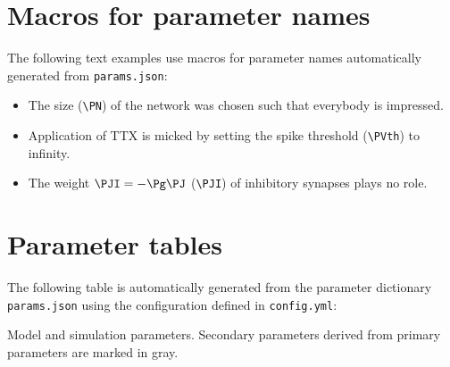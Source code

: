 \documentclass[10pt,a4paper,american]{article}
\begin{document}
\section{Macros for parameter names}


The following text examples use macros for parameter names automatically generated from \texttt{params.json}:
\begin{itemize}
\item The size \PN (\verb+\PN+) of the network was chosen such that everybody is impressed.
\item Application of TTX is micked by setting the spike threshold \PVth (\verb+\PVth+) to infinity.
\item The weight $\PJI=-\Pg\PJ$ (\verb+\PJI+) of inhibitory synapses plays no role.
\end{itemize}

\section{Parameter tables}
The following table is automatically generated from the parameter dictionary \texttt{params.json} using the configuration defined in \texttt{config.yml}: 
\begin{table}[ht!]
\begin{center}
  \parbox{0.8\linewidth}{       %
    \small%
    \centering%
    \renewcommand{\arraystretch}{1.2}%
    \noindent%
    \caption{Model and simulation parameters. Secondary parameters derived from primary parameters are marked in gray.}
    \label{tab:parameter_table}
  }
\end{center}
\end{table}
\end{document}
